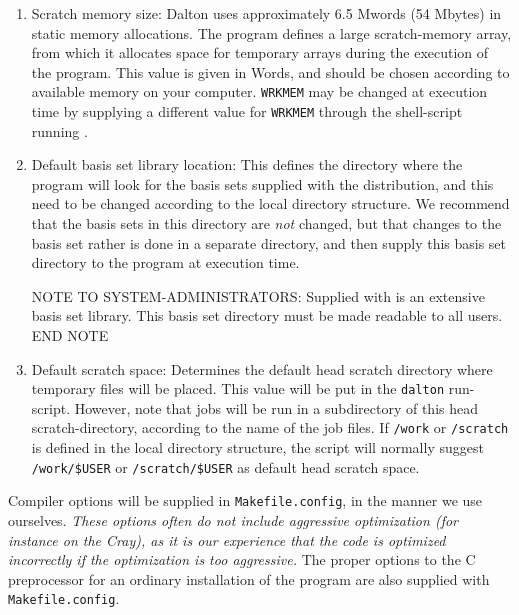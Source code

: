 \begin{enumerate}
\item Scratch memory
size: Dalton uses approximately 6.5 Mwords (54 Mbytes)
in static memory allocations. The program defines a large scratch-memory
array, from which it allocates space for temporary arrays
during the execution of the program. This value is given in Words, and
should be chosen according to available memory on your computer.
\verb|WRKMEM| may be changed at execution time by supplying a
different value for \verb|WRKMEM| through the shell-script running
{\dalton}.

\item Default basis set library
location: This defines the directory where the program will look for the
basis sets supplied with the distribution, and this need to be
changed according to the local directory structure. We recommend
that the basis sets in this directory are {\em not} changed, but
that changes to the basis set rather is done in a separate
directory, and then supply this basis set directory to the program
at execution time.

{\sc NOTE TO SYSTEM-ADMINISTRATORS:} Supplied with {\dalton} is an
extensive basis set library. This basis set directory must be made
readable to all users. {\sc END NOTE}

\item Default scratch
space:
Determines the default head scratch
directory where temporary files will be placed. This value will be put
in the \verb|dalton| run-script. However, note that jobs will be run in
a subdirectory of this head scratch-directory, according to the name
of the job files. If \verb|/work| or \verb|/scratch| is defined in the
local directory structure, the script will normally suggest
\verb|/work/$USER| or  \verb|/scratch/$USER| as default head scratch space.

\end{enumerate}

Compiler options will be supplied in \verb|Makefile.config|, in the manner
we use ourselves. {\em These options often do not include aggressive
optimization (for instance on the Cray), as
it is our experience that
the code is optimized incorrectly if the optimization is too
aggressive.} The proper options to the C preprocessor for an ordinary
installation of the program are also supplied with
\verb|Makefile.config|.

